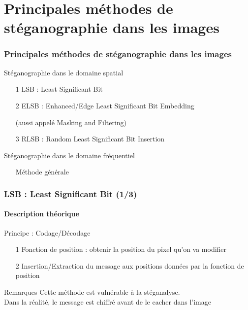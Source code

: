 \documentclass{beamer}
\begin{document}
\section{Principales méthodes de stéganographie dans les images}
\begin{frame}
\frametitle{Principales méthodes de stéganographie dans les images}

\begin{exampleblock}{Stéganographie dans le domaine spatial}
\begin{itemize}
    \item[1] LSB : Least Significant Bit
    \item[]
    \item[2] ELSB : Enhanced/Edge Least Significant Bit Embedding
    \item[] (aussi appelé Masking and Filtering)
    \item[]
    \item[3] RLSB : Random Least Significant Bit Insertion
\end{itemize}
\end{exampleblock}

\begin{exampleblock}{Stéganographie dans le domaine fréquentiel}
\begin{itemize}
    \item[] Méthode générale
\end{itemize}
\end{exampleblock}
\end{frame}

\begin{frame}
\frametitle{LSB : Least Significant Bit (1/3)}
\framesubtitle{Description théorique}

\begin{block}{Principe : Codage/Décodage}
\begin{itemize}
    \item[1] Fonction de position : obtenir la position du pixel qu'on va modifier %
    \item[2] Insertion/Extraction du message aux positions données par la fonction de position
\end{itemize}
\end{block}

\begin{alertblock}{Remarques}
Cette méthode est vulnérable à la stéganalyse. \\
Dans la réalité, le message est chiffré avant de le cacher dans l'image
\end{alertblock}
\end{frame}
\end{document}
